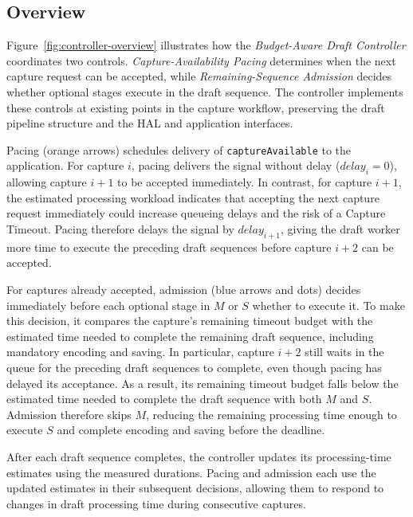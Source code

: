 \subsection{Overview}
\label{sec:overview}

Figure~\ref{fig:controller-overview} illustrates how the \emph{Budget-Aware Draft Controller} coordinates two controls.
\emph{Capture-Availability Pacing} determines when the next capture request can be accepted, while \emph{Remaining-Sequence Admission} decides whether optional stages execute in the draft sequence.
The controller implements these controls at existing points in the capture workflow, preserving the draft pipeline structure and the HAL and application interfaces.

Pacing (orange arrows) schedules delivery of \texttt{captureAvailable} to the application.
For capture \(i\), pacing delivers the signal without delay (\(\mathit{delay}_i=0\)), allowing capture \(i+1\) to be accepted immediately.
In contrast, for capture \(i+1\), the estimated processing workload indicates that accepting the next capture request immediately could increase queueing delays and the risk of a Capture Timeout.
Pacing therefore delays the signal by \(\mathit{delay}_{i+1}\), giving the draft worker more time to execute the preceding draft sequences before capture \(i+2\) can be accepted.

For captures already accepted, admission (blue arrows and dots) decides immediately before each optional stage in \(M\) or \(S\) whether to execute it.
To make this decision, it compares the capture's remaining timeout budget with the estimated time needed to complete the remaining draft sequence, including mandatory encoding and saving.
In particular, capture \(i+2\) still waits in the queue for the preceding draft sequences to complete, even though pacing has delayed its acceptance.
As a result, its remaining timeout budget falls below the estimated time needed to complete the draft sequence with both \(M\) and \(S\).
Admission therefore skips \(M\), reducing the remaining processing time enough to execute \(S\) and complete encoding and saving before the deadline.

After each draft sequence completes, the controller updates its processing-time estimates using the measured durations.
Pacing and admission each use the updated estimates in their subsequent decisions, allowing them to respond to changes in draft processing time during consecutive captures.



